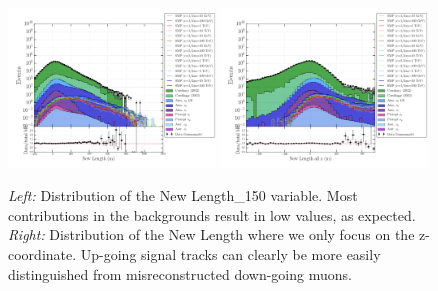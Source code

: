 \begin{figure}
\centering
\includegraphics[width=0.49\textwidth]{chapter8/img/1D_stack_newlength_150.png}
\includegraphics[width=0.49\textwidth]{chapter8/img/1D_stack_newlength_all_z.png}
\caption{\textit{Left: }Distribution of the New Length\_150 variable. Most contributions in the backgrounds result in low values, as expected. \textit{Right: }Distribution of the New Length where we only focus on the z-coordinate. Up-going signal tracks can clearly be more easily distinguished from misreconstructed down-going muons.}
\label{fig:newvariables2}
\end{figure}

